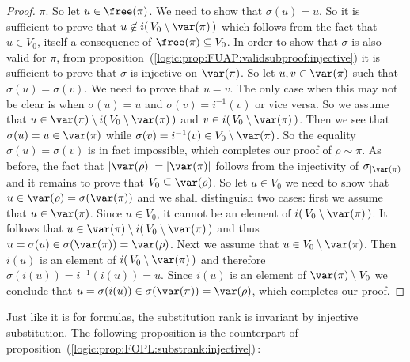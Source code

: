 \begin{proof}
$\pi$. So let $u\in\free(\pi)$. We need to show that $\sigma(u)=u$.
So it is sufficient to prove that $u\not\in
i(\,V_{0}\setminus\var(\pi)\,)$ which follows from the fact that
$u\in V_{0}$, itself a consequence of $\free(\pi)\subseteq V_{0}$.
In order to show that $\sigma$ is also valid for $\pi$, from
proposition~(\ref{logic:prop:FUAP:validsubproof:injective}) it is
sufficient to prove that $\sigma$ is injective on $\var(\pi)$. So
let $u,v\in\var(\pi)$ such that $\sigma(u)=\sigma(v)$. We need to
prove that $u=v$. The only case when this may not be clear is when
$\sigma(u)=u$ and $\sigma(v)=i^{-1}(v)$ or vice versa. So we assume
that $u\in\var(\pi)\setminus i(\,V_{0}\setminus\var(\pi)\,)$ and $
v\in i(\,V_{0}\setminus\var(\pi)\,)$. Then we see that
$\sigma(u)=u\in\var(\pi)$ while $\sigma(v)=i^{-1}(v)\in
V_{0}\setminus\var(\pi)$. So the equality $\sigma(u)=\sigma(v)$ is
in fact impossible, which completes our proof of $\rho\sim\pi$. As
before, the fact that $|\var(\rho)|=|\var(\pi)|$ follows from the
injectivity of $\sigma_{|\var(\pi)}$ and it remains to prove that
$V_{0}\subseteq\var(\rho)$. So let $u\in V_{0}$ we need to show that
$u\in\var(\rho)=\sigma(\var(\pi))$ and we shall distinguish two
cases: first we assume that $u\in\var(\pi)$. Since $u\in V_{0}$, it
cannot be an element of $i(\,V_{0}\setminus\var(\pi)\,)$. It follows
that $u\in\var(\pi)\setminus i(\,V_{0}\setminus\var(\pi)\,)$ and
thus $u=\sigma(u)\in\sigma(\var(\pi))=\var(\rho)$. Next we assume
that $u\in V_{0}\setminus\var(\pi)$. Then $i(u)$ is an element of
$i(\,V_{0}\setminus\var(\pi)\,)$ and therefore
$\sigma(i(u))=i^{-1}(i(u))=u$. Since $i(u)$ is an element of
$\var(\pi)\setminus V_{0}$ we conclude that
$u=\sigma(i(u))\in\sigma(\var(\pi))=\var(\rho)$, which completes our
proof.
\end{proof}

Just like it is for formulas, the substitution rank is invariant by
injective substitution. The following proposition is the counterpart
of proposition~(\ref{logic:prop:FOPL:substrank:injective})\,:

